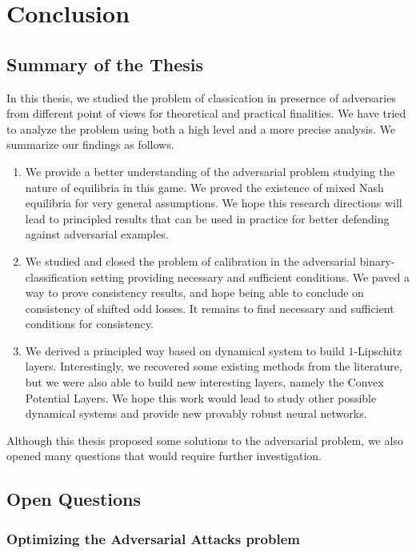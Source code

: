 \chapter{Conclusion}
\minitoc
\section{Summary of the Thesis}

In this thesis, we studied the problem of  classication in presernce of adversaries from different point of views for theoretical and practical finalities. We have tried to analyze the problem using both a high level
and a more precise analysis. We summarize our findings as follows.
\begin{tcolorbox}[colback=grund,colframe=rahmen,title=Summary of contributions]
\begin{enumerate}
    \item We provide a better understanding of the adversarial problem studying the nature of equilibria in this game. We proved the existence of mixed Nash equilibria for very general assumptions. We hope this research directions will lead to principled results that can be used in practice for better defending against adversarial examples.
    \item We studied and closed the problem of calibration in the adversarial binary-classification setting providing necessary and sufficient conditions. We paved a way to prove consistency results, and hope being able to conclude on consistency of shifted odd losses. It remains to find necessary and sufficient conditions for consistency.
    \item We derived a principled way based on dynamical system to build $1$-Lipschitz layers. Interestingly, we recovered some existing methods from the literature, but we were also able to build new interesting layers, namely the Convex Potential Layers. We hope this work would lead to study other possible dynamical systems and provide new provably robust neural networks.
\end{enumerate}
\end{tcolorbox}
Although this thesis proposed some solutions to the adversarial problem, we also opened many questions that would require further investigation. 
\section{Open Questions}



\subsection{Optimizing the Adversarial Attacks problem}

